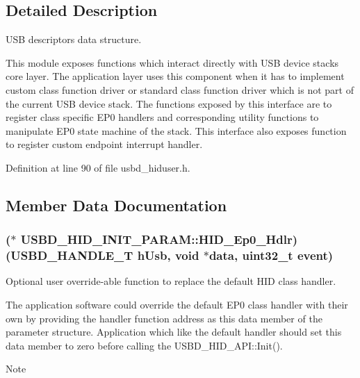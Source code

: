\subsection{Detailed Description}
U\+SB descriptors data structure. 

This module exposes functions which interact directly with U\+SB device stack\textquotesingle{}s core layer. The application layer uses this component when it has to implement custom class function driver or standard class function driver which is not part of the current U\+SB device stack. The functions exposed by this interface are to register class specific E\+P0 handlers and corresponding utility functions to manipulate E\+P0 state machine of the stack. This interface also exposes function to register custom endpoint interrupt handler. 

Definition at line 90 of file usbd\+\_\+hiduser.\+h.



\subsection{Member Data Documentation}
\subsubsection[{\texorpdfstring{H\+I\+D\+\_\+\+Ep0\+\_\+\+Hdlr}{HID_Ep0_Hdlr}}]{($\ast$ U\+S\+B\+D\+\_\+\+H\+I\+D\+\_\+\+I\+N\+I\+T\+\_\+\+P\+A\+R\+A\+M\+::\+H\+I\+D\+\_\+\+Ep0\+\_\+\+Hdlr) ({\bf U\+S\+B\+D\+\_\+\+H\+A\+N\+D\+L\+E\+\_\+T} h\+Usb, void $\ast$data, uint32\+\_\+t event)}\hypertarget{structUSBD__HID__INIT__PARAM_abb727433ef7a7de8566347963d5b8dc0}{}\label{structUSBD__HID__INIT__PARAM_abb727433ef7a7de8566347963d5b8dc0}
Optional user override-\/able function to replace the default H\+ID class handler.

The application software could override the default E\+P0 class handler with their own by providing the handler function address as this data member of the parameter structure. Application which like the default handler should set this data member to zero before calling the U\+S\+B\+D\+\_\+\+H\+I\+D\+\_\+\+A\+P\+I\+::\+Init(). ~\newline
\begin{DoxyNote}{Note}

\end{DoxyNote}

